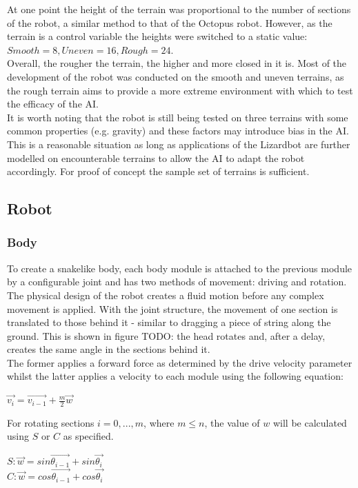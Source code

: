 \documentclass{article}
\begin{document}
At one point the height of the terrain was proportional to the number of sections of the robot, a similar method to that of the Octopus robot. However, as the terrain is a control variable the heights were switched to a static value: $Smooth=8, Uneven=16, Rough=24$.\\
Overall, the rougher the terrain, the higher and more closed in it is. Most of the development of the robot was conducted on the smooth and uneven terrains, as the rough terrain aims to provide a more extreme environment with which to test the efficacy of the AI.\\
It is worth noting that the robot is still being tested on three terrains with some common properties (e.g. gravity) and these factors may introduce bias in the AI. This is a reasonable situation as long as applications of the Lizardbot are further modelled on encounterable terrains to allow the AI to adapt the robot accordingly. For proof of concept the sample set of terrains is sufficient.

\subsection{Robot}
\subsubsection{Body}
To create a snakelike body, each body module is attached to the previous module by a configurable joint  and has two methods of movement: driving and rotation. The physical design of the robot creates a fluid motion before any complex movement is applied. With the joint structure, the movement of one section is translated to those behind it - similar to dragging a piece of string along the ground. This is shown in figure TODO: the head rotates and, after a delay, creates the same angle in the sections behind it.\\
The former applies a forward force as determined by the drive velocity parameter whilst the latter applies a velocity to each module using the following equation:
\begin{center}
\begin{Large}
$\overrightarrow{v_{i}} = \overrightarrow{v_{i-1}} + \frac{m}{2}\overrightarrow{w} $
\end{Large}
\end{center}

For rotating sections $i = 0, ..., m$, where $m \leq n$, the value of $w$ will be calculated using $S$ or $C$ as specified.\\
\begin{center}
\begin{Large}
$S: \overrightarrow{w} = sin\overrightarrow{\theta_{i-1}} + sin\overrightarrow{\theta_{i}}$
\\[1\baselineskip]
$C: \overrightarrow{w} = cos\overrightarrow{\theta_{i-1}} + cos\overrightarrow{\theta_{i}}$\\
\end{Large}
\end{center}
\end{document}

